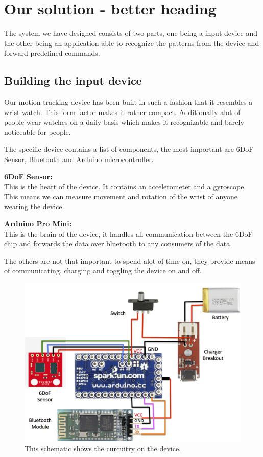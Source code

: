 \section{Our solution - better heading}
The system we have designed consists of two parts,
one being a input device
and the other being an application able to recognize the patterns from the device and forward predefined commands.

\subsection{Building the input device}
Our motion tracking device has been built in such a fashion that it resembles a wrist watch.
This form factor makes it rather compact.
Additionally alot of people wear watches on a daily basis which makes it recognizable and barely noticeable for people.

The specific device contains a list of components, the most important are 6DoF Sensor, Bluetooth and Arduino microcontroller.

\textbf{6DoF Sensor:}\\
This is the heart of the device. It contains an accelerometer and a gyroscope. This means we can measure movement and rotation of the wrist of anyone wearing the device.

\textbf{Arduino Pro Mini:}\\
This is the brain of the device, it handles all communication between the 6DoF chip and forwards the data over bluetooth to any consumers of the data.

The others are not that important to spend alot of time on, they provide means of communicating, charging and toggling the device on and off.

\begin{figure}[!h]
\centering
\includegraphics[width=0.9\columnwidth]{img/device_schematic}
\caption{This schematic shows the curcuitry on the device.}
\label{fig:figure1}
\end{figure}

